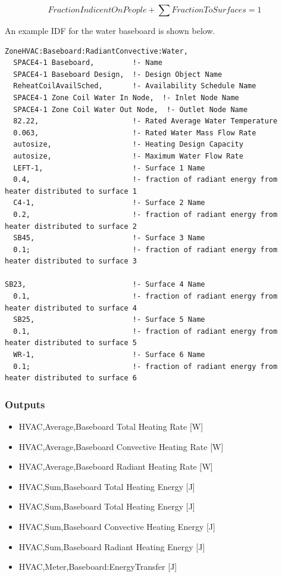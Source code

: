 \begin{equation}
FractionIndicentOnPeople + \sum {FractionToSurfaces = 1}
\end{equation}

An example IDF for the water baseboard is shown below.

\begin{lstlisting}
ZoneHVAC:Baseboard:RadiantConvective:Water,
  SPACE4-1 Baseboard,         !- Name
  SPACE4-1 Baseboard Design,  !- Design Object Name
  ReheatCoilAvailSched,       !- Availability Schedule Name
  SPACE4-1 Zone Coil Water In Node,  !- Inlet Node Name
  SPACE4-1 Zone Coil Water Out Node,  !- Outlet Node Name
  82.22,                      !- Rated Average Water Temperature
  0.063,                      !- Rated Water Mass Flow Rate
  autosize,                   !- Heating Design Capacity
  autosize,                   !- Maximum Water Flow Rate
  LEFT-1,                     !- Surface 1 Name
  0.4,                        !- fraction of radiant energy from heater distributed to surface 1
  C4-1,                       !- Surface 2 Name
  0.2,                        !- fraction of radiant energy from heater distributed to surface 2
  SB45,                       !- Surface 3 Name
  0.1;                        !- fraction of radiant energy from heater distributed to surface 3

SB23,                         !- Surface 4 Name
  0.1,                        !- fraction of radiant energy from heater distributed to surface 4
  SB25,                       !- Surface 5 Name
  0.1,                        !- fraction of radiant energy from heater distributed to surface 5
  WR-1,                       !- Surface 6 Name
  0.1;                        !- fraction of radiant energy from heater distributed to surface 6
\end{lstlisting}


\subsubsection{Outputs}\label{outputs-027}

\begin{itemize}
\item
  HVAC,Average,Baseboard Total Heating Rate {[}W{]}
\item
  HVAC,Average,Baseboard Convective Heating Rate {[}W{]}
\item
  HVAC,Average,Baseboard Radiant Heating Rate {[}W{]}
\item
  HVAC,Sum,Baseboard Total Heating Energy {[}J{]}
\item
  HVAC,Sum,Baseboard Total Heating Energy {[}J{]}
\item
  HVAC,Sum,Baseboard Convective Heating Energy {[}J{]}
\item
  HVAC,Sum,Baseboard Radiant Heating Energy {[}J{]}
\item
  HVAC,Meter,Baseboard:EnergyTransfer {[}J{]}
\end{itemize}

